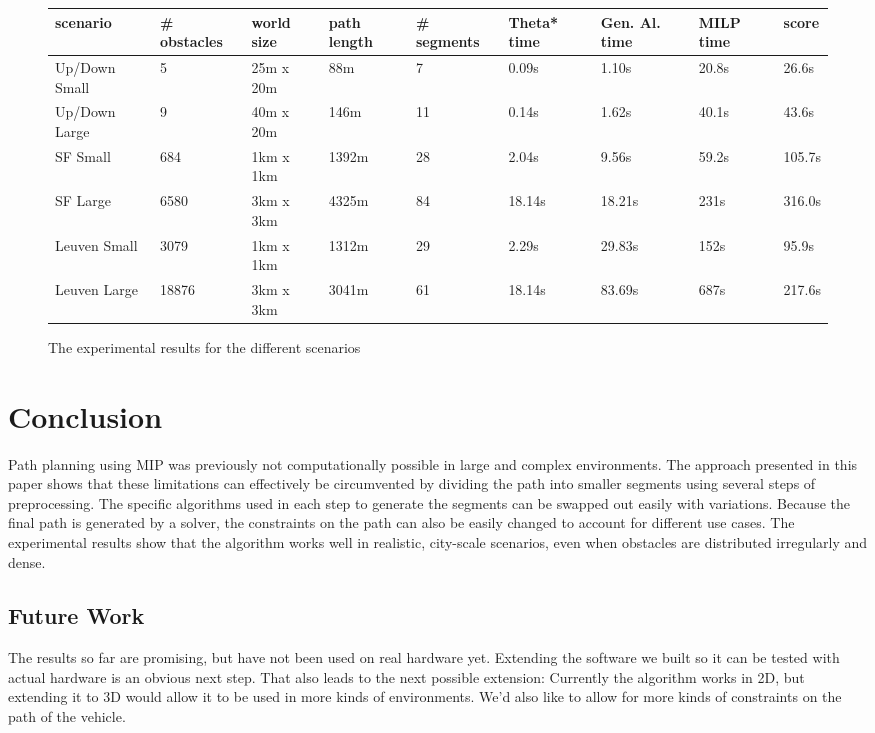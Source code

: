 \begin{figure}
\begin{tabular}{ l l l l l l l l l }
 scenario & \# obstacles & world size & path length & \# segments & Theta* time & Gen. Al. time & MILP time & score \\ 
 \hline
Up/Down Small & 5 &  25m x 20m & 88m  & 7 & 0.09s & 1.10s & 20.8s & 26.6s\\
Up/Down Large & 9 & 40m x 20m &  146m & 11 & 0.14s & 1.62s & 40.1s & 43.6s \\
SF Small & 684 & 1km x 1km & 1392m & 28 & 2.04s & 9.56s & 59.2s & 105.7s \\
SF Large & 6580 & 3km x 3km & 4325m  & 84 & 18.14s & 18.21s & 231s & 316.0s\\
Leuven Small & 3079 & 1km x 1km & 1312m & 29 &  2.29s & 29.83s & 152s  & 95.9s \\
Leuven Large & 18876 & 3km x 3km & 3041m & 61 & 18.14s & 83.69s & 687s & 217.6s \\

\end{tabular}
\caption{The experimental results for the different scenarios}
\label{table:results}
\end{figure}

\section{Conclusion}
Path planning using MIP was previously not computationally possible in large and complex environments. The approach presented in this paper shows that these limitations can effectively be circumvented by dividing the path into smaller segments using several steps of preprocessing. The specific algorithms used in each step to generate the segments can be swapped out easily with variations. Because the final path is generated by a solver, the constraints on the path can also be easily changed to account for different use cases. The experimental results show that the algorithm works well in realistic, city-scale scenarios, even when obstacles are distributed irregularly and dense.

\subsection{Future Work}
The results so far are promising, but have not been used on real hardware yet. Extending the software we built so it can be tested with actual hardware is an obvious next step. That also leads to the next possible extension: Currently the algorithm works in 2D, but extending it to 3D would allow it to be used in more kinds of environments. We'd also like to allow for more kinds of constraints on the path of the vehicle.